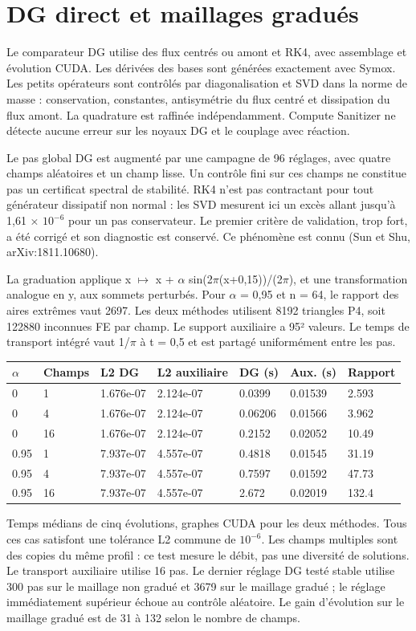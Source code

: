 \documentclass[10pt,a4paper]{article}
\begin{document}
\section{DG direct et maillages gradués}
Le comparateur DG utilise des flux centrés ou amont et RK4, avec assemblage et évolution CUDA. Les dérivées des bases sont générées exactement avec Symox. Les petits opérateurs sont contrôlés par diagonalisation et SVD dans la norme de masse : conservation, constantes, antisymétrie du flux centré et dissipation du flux amont. La quadrature est raffinée indépendamment. Compute Sanitizer ne détecte aucune erreur sur les noyaux DG et le couplage avec réaction.

Le pas global DG est augmenté par une campagne de 96 réglages, avec quatre champs aléatoires et un champ lisse. Un contrôle fini sur ces champs ne constitue pas un certificat spectral de stabilité. RK4 n'est pas contractant pour tout générateur dissipatif non normal : les SVD mesurent ici un excès allant jusqu'à 1,61 × \(10^{-6}\) pour un pas conservateur. Le premier critère de validation, trop fort, a été corrigé et son diagnostic est conservé. Ce phénomène est connu (Sun et Shu, arXiv:1811.10680).

La graduation applique x \(\mapsto\) x + \(\alpha\) sin(2\(\pi\)(x+0,15))/(2\(\pi\)), et une transformation analogue en y, aux sommets perturbés. Pour \(\alpha\) = 0,95 et n = 64, le rapport des aires extrêmes vaut 2697. Les deux méthodes utilisent 8192 triangles P4, soit 122880 inconnues FE par champ. Le support auxiliaire a 95² valeurs. Le temps de transport intégré vaut 1/\(\pi\) à t = 0,5 et est partagé uniformément entre les pas.

\begin{center}\small\begin{tabular}{lllllll}\toprule
\(\alpha\) & Champs & L2 DG & L2 auxiliaire & DG (s) & Aux. (s) & Rapport\\\midrule
0 & 1 & 1.676e-07 & 2.124e-07 & 0.0399 & 0.01539 & 2.593\\
0 & 4 & 1.676e-07 & 2.124e-07 & 0.06206 & 0.01566 & 3.962\\
0 & 16 & 1.676e-07 & 2.124e-07 & 0.2152 & 0.02052 & 10.49\\
0.95 & 1 & 7.937e-07 & 4.557e-07 & 0.4818 & 0.01545 & 31.19\\
0.95 & 4 & 7.937e-07 & 4.557e-07 & 0.7597 & 0.01592 & 47.73\\
0.95 & 16 & 7.937e-07 & 4.557e-07 & 2.672 & 0.02019 & 132.4\\
\bottomrule\end{tabular}\end{center}
Temps médians de cinq évolutions, graphes CUDA pour les deux méthodes. Tous ces cas satisfont une tolérance L2 commune de \(10^{-6}\). Les champs multiples sont des copies du même profil : ce test mesure le débit, pas une diversité de solutions. Le transport auxiliaire utilise 16 pas. Le dernier réglage DG testé stable utilise 300 pas sur le maillage non gradué et 3679 sur le maillage gradué ; le réglage immédiatement supérieur échoue au contrôle aléatoire. Le gain d'évolution sur le maillage gradué est de 31 à 132 selon le nombre de champs.
\end{document}
